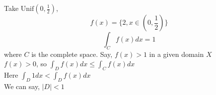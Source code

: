 Take \(\text{Unif}(0, \frac{1}{2})\), \\
\[f(x) = \{ 2, x \in (0, \frac{1}{2})\}\]
\[\int_C f(x) dx = 1\] where \(C\) is the complete space.
Say, \(f(x) > 1\) in a given domain \(X\) \\
\(f(x) > 0\), so \(\int_D f(x) dx \le \int_C f(x) dx \) \\
Here \(\int_D 1 dx < \int_D f(x) dx\) \\
We can say, \(|D| < 1\)